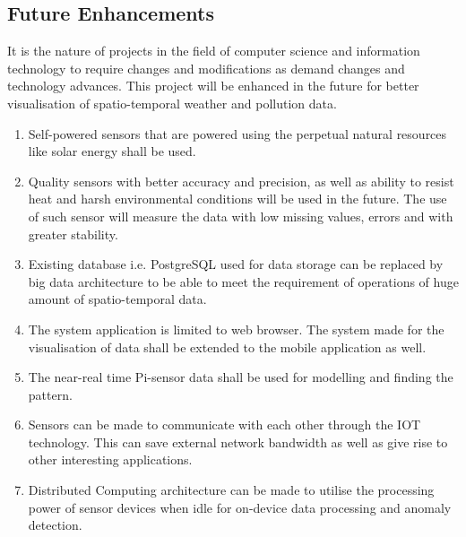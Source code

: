 \newpage
\subsection{Future Enhancements}

It is the nature of projects in the field of computer science and information technology to require changes and modifications as demand changes and technology advances. This project will be enhanced in the future for better visualisation of spatio-temporal weather and pollution data.

\begin{enumerate}
  \setlength\itemsep{1.5em}
    \item Self-powered sensors that are powered using the perpetual natural resources like solar energy shall be used.

	\item Quality sensors with better accuracy and precision, as well as ability to resist heat and harsh environmental conditions will be used in the future. The use of such sensor will measure the data with low missing values, errors and with greater stability.
	
	\item Existing database i.e. PostgreSQL used for data storage can be replaced by big data architecture to be able to meet the requirement of operations of huge amount of spatio-temporal data.
	
	
	\item The system application is limited to web browser. The system made for the visualisation of data shall be extended to the mobile application as well.
	
	\item The near-real time Pi-sensor data shall be used for modelling and finding the pattern.
	

	\item  Sensors can be made to communicate with each other through the IOT technology. This can save external network bandwidth as well as give rise to other interesting applications.
	
		\item  Distributed Computing architecture can be made to utilise the processing power of sensor devices when idle for on-device data processing and anomaly detection.
	          
\end{enumerate}